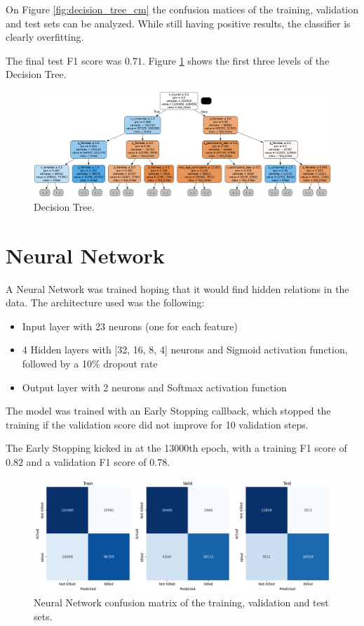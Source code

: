 On Figure \ref{fig:decision_tree_cm} the confusion matices of the training, validation and test sets can be analyzed. While still having positive results, the classifier is clearly overfitting.

The final test F1 score was $0.71$. Figure \ref{fig:decision_tree} shows the first three levels of the Decision Tree.

\begin{figure}[h]
    \centering
    \includegraphics[width=\textwidth]{images/Clustering/decision_tree.png}
    \caption{Decision Tree.}
    \label{fig:decision_tree}
\end{figure}

\section{Neural Network}

A Neural Network was trained hoping that it would find hidden relations in the data. The architecture used was the following:

\begin{itemize}
    \item Input layer with 23 neurons (one for each feature)
    \item 4 Hidden layers with [32, 16, 8, 4] neurons and Sigmoid activation function, followed by a 10\% dropout rate
    \item Output layer with 2 neurons and Softmax activation function
\end{itemize}

The model was trained with an Early Stopping callback, which stopped the training if the validation score did not improve for 10 validation steps.

The Early Stopping kicked in at the 13000th epoch, with a training F1 score of $0.82$ and a validation F1 score of $0.78$.

\begin{figure}[h]
    \centering
    \includegraphics[width=\textwidth]{images/Clustering/nn_cm.png}
    \caption{Neural Network confusion matrix of the training, validation and test sets.}
    \label{fig:nn_cm}
\end{figure}

